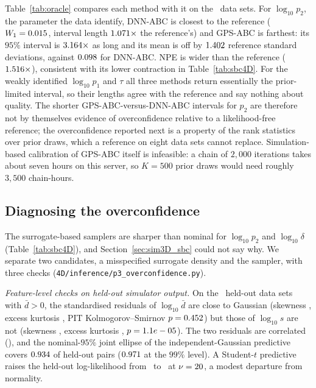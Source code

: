 \documentclass[sn-basic,iicol,pdflatex]{sn-jnl}
\begin{document}
Table~\ref{tab:oracle} compares each method with it on the \ptwoSummaryDnnAbcLogPTwoN\ data sets. For $\log_{10}p_2$, the parameter the data identify,
DNN-ABC is closest to the reference ($W_1=0.015$, interval length $1.071\times$ the reference's)
and GPS-ABC is farthest: its $95\%$ interval is $3.164\times$ as long and its mean is off by $1.402$ reference standard
deviations, against $0.098$ for DNN-ABC. NPE is wider than the reference
($1.516\times$), consistent with its lower contraction in Table~\ref{tab:sbc4D}. For the weakly identified $\log_{10}p_1$ and $\tau$ all three methods
return essentially the prior-limited interval, so their lengths agree with the reference and say nothing about quality. The shorter GPS-ABC-versus-DNN-ABC intervals
for $p_2$ are therefore not by themselves evidence of overconfidence relative to a likelihood-free reference; the overconfidence
reported next is a property of the rank statistics over prior draws, which a reference on eight data sets cannot replace.
Simulation-based calibration of GPS-ABC itself is infeasible: a chain of $2{,}000$ iterations takes about seven hours on this server, so $K=500$ prior draws would need roughly $3{,}500$ chain-hours.

\begin{table}[t]
\centering
\caption{Study II: distance of each method's posterior from the synthetic-likelihood reference, $4$ data sets in each of the $2$ cases
(means over data sets). $W_1$ is in parameter units ($\log_{10}$ units for the rates); GPS-ABC is analysed at $2{,}000$ iterations.}
\label{tab:oracle}
\small

\end{table}

\subsection{Diagnosing the overconfidence}
\label{sec:diagnose}

The surrogate-based samplers are sharper than nominal for $\log_{10}p_2$ and $\log_{10}\delta$ (Table~\ref{tab:sbc4D}), and Section~\ref{sec:sim3D_sbc} could not say why.
We separate two candidates, a misspecified surrogate density and the sampler, with three checks (\texttt{4D/inference/p3\_overconfidence.py}).

\emph{Feature-level checks on held-out simulator output.} On the \pfcNTestNonzero\ held-out data sets with $\bar d>0$, the standardised residuals of
$\log_{10}\bar d$ are close to Gaussian (skewness \pfcLogDbarSkew, excess kurtosis \pfcLogDbarExcessKurt, PIT Kolmogorov--Smirnov $p=0.452$) but those of $\log_{10}s$ are
not (skewness \pfcLogSSkew, excess kurtosis \pfcLogSExcessKurt, $p=1.1e-05$). The two residuals are correlated (\pfcJointCorr), and the nominal-$95\%$ joint ellipse of the
independent-Gaussian predictive covers $0.934$ of held-out pairs ($0.971$ at the $99\%$ level). A Student-$t$
predictive raises the held-out log-likelihood from \pfcValLoglikGauss\ to \pfcValLoglikT\ at $\nu=20$, a modest departure from normality.
\end{document}
